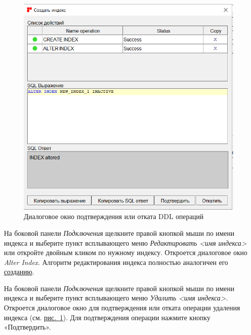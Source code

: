 \begin{figure}[H]
	\caption{Диалоговое окно подтверждения или отката DDL операций}\label{ris:01}
	\centering
	\includegraphics[width = 0.48\linewidth]{img/create_index2.png}
\end{figure}

На боковой панели \textit{Подключения} щелкните правой кнопкой мыши по имени индекса и выберите пункт всплывающего меню \textit{Редактировать <имя индекса>} или откройте двойным кликом по нужному индексу. Откроется диалоговое окно \textit{Alter Index}. Алгоритм редактирования индекса полностью аналогичен его \hyperref[sec:crind]{созданию}.

На боковой панели \textit{Подключения} щелкните правой кнопкой мыши по имени индекса и выберите пункт всплывающего меню \textit{Удалить <имя индекса>}. Откроется  диалоговое окно для подтверждения или отката операции удаления индекса (см. \hyperref[ris:01]{рис.~\ref{ris:01}}). Для подтверждения операции нажмите кнопку «Подтвердить».


